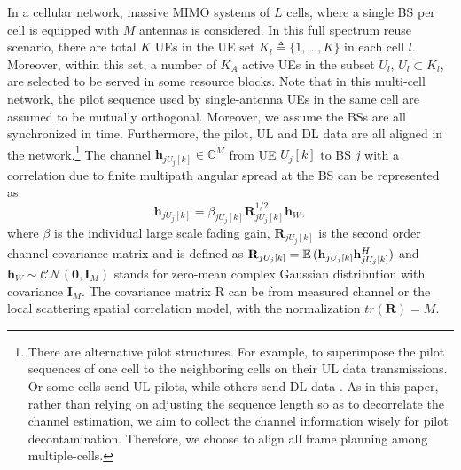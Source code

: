 In a cellular network, massive MIMO systems of $L$ cells, where a single BS per cell is equipped 
with $M$ antennas is considered. %
In this full spectrum reuse scenario, there are total $K$ UEs in the UE set $K_l\triangleq\{1,...,K\}$ in each cell $l$. Moreover, within this set, a number of $K_A$ active UEs in the subset $U_l$, $U_l\subset K_l$, are selected to be served in some resource blocks. Note that in this multi-cell network, the pilot sequence used by single-antenna UEs in the same
cell are assumed to be mutually orthogonal. Moreover, we assume the BSs are all synchronized in time. Furthermore, the pilot, UL and DL data are all aligned in the network.\footnote{There are alternative pilot structures. For example, to superimpose  the pilot sequences of one cell to the neighboring cells on their UL data transmissions\cite{upadhya2017superimposed}. Or some cells send UL pilots, while others send DL data \cite{fernandes2013inter}. As in this paper, rather than relying on adjusting the sequence length so as to decorrelate the channel estimation, we aim to collect the channel information wisely for pilot decontamination. Therefore, we choose to align all frame planning among multiple-cells.} The channel $\mathbf{h}_{jU_j[k]}\in\mathbb{C}^{M}$ from UE $U_j[k]$ to BS $j$ with a correlation due to finite multipath angular spread at the BS  can be represented as
\begin{equation}
\mathbf{h}_{jU_{j}[k]}=\beta_{jU_{j}[k]}\mathbf{R}_{jU_{j}[k]}^{1/2}\mathbf{h}_{W},
\end{equation}
where $\beta$ is the individual large scale fading gain, $\mathbf{R}_{jU_{j}[k]}$ is the second order channel covariance matrix and is defined as $\mathbf{R}_{jU_j[k]}=\operatorname{\mathbb{E}}{({\mathbf{h}}_{jU_j[k]}{\mathbf{h}}_{jU_j[k]}^H)}$ and $\mathbf{h}_{W}\sim \mathcal{CN}\left(\mathbf{0},\mathbf{I}_M\right)$ stands for zero-mean complex Gaussian distribution with covariance $\mathbf{I}_M$. The covariance matrix R can be from measured channel or the local scattering spatial correlation model\cite{bjornson2017massive}, with the normalization $tr(\mathbf{R})=M$.

